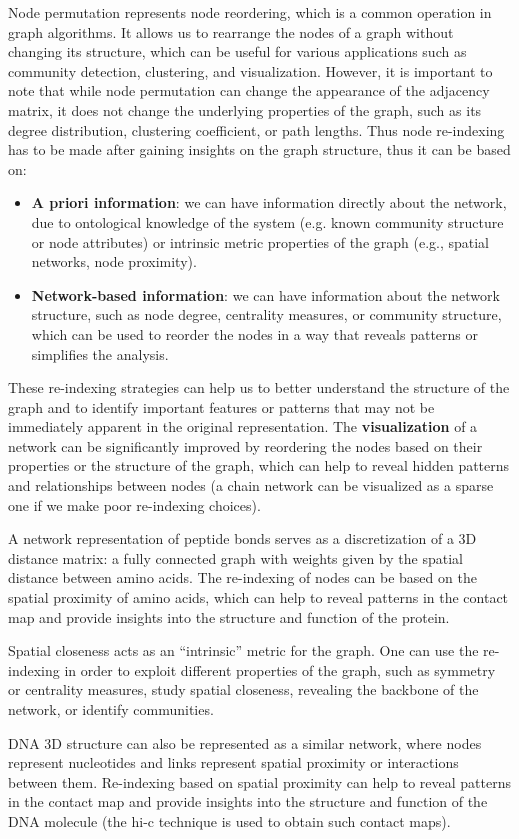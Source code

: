 \begin{remark}[Re-indexing]
    Node permutation represents node reordering, which is a common operation in graph algorithms. It allows us to rearrange the nodes of a graph without changing its structure, which can be useful for various applications such as community detection, clustering, and visualization. However, it is important to note that while node permutation can change the appearance of the adjacency matrix, it does not change the underlying properties of the graph, such as its degree distribution, clustering coefficient, or path lengths. Thus node re-indexing has to be made after gaining insights on the graph structure, thus it can be based on:
    \begin{itemize}
        \item \textbf{A priori information}: we can have information directly about the network, due to ontological knowledge of the system (e.g. known community structure or node attributes) or intrinsic metric properties of the graph (e.g., spatial networks, node proximity).
        \item \textbf{Network-based information}: we can have information about the network structure, such as node degree, centrality measures, or community structure, which can be used to reorder the nodes in a way that reveals patterns or simplifies the analysis.
    \end{itemize}
\end{remark}
These re-indexing strategies can help us to better understand the structure of the graph and to identify important features or patterns that may not be immediately apparent in the original representation. The \textbf{visualization} of a network can be significantly improved by reordering the nodes based on their properties or the structure of the graph, which can help to reveal hidden patterns and relationships between nodes (a chain network can be visualized as a sparse one if we make poor re-indexing choices).

\begin{example}
    A network representation of peptide bonds serves as a discretization of a 3D distance matrix: a fully connected graph with weights given by the spatial distance between amino acids. The re-indexing of nodes can be based on the spatial proximity of amino acids, which can help to reveal patterns in the contact map and provide insights into the structure and function of the protein.

    Spatial closeness acts as an ``intrinsic'' metric for the graph. One can use the re-indexing in order to exploit different properties of the graph, such as symmetry or centrality measures, study spatial closeness, revealing the backbone of the network, or identify communities.

    DNA 3D structure can also be represented as a similar network, where nodes represent nucleotides and links represent spatial proximity or interactions between them. Re-indexing based on spatial proximity can help to reveal patterns in the contact map and provide insights into the structure and function of the DNA molecule (the hi-c technique is used to obtain such contact maps).
\end{example}

